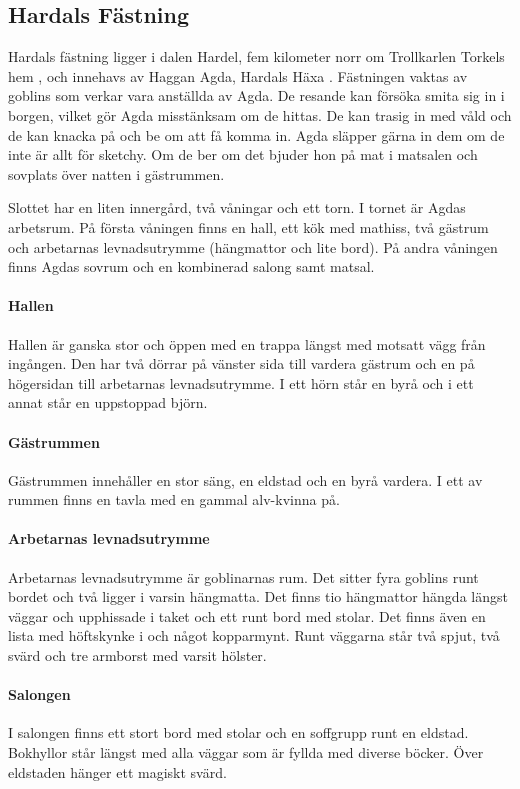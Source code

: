 \subsection{Hardals Fästning}
Hardals fästning ligger i dalen Hardel, fem kilometer norr om Trollkarlen Torkels hem \sectiondescribe{\ref{torkelsStuga}}, och innehavs av Haggan Agda, Hardals Häxa \sectiondescribe{\ref{hagganAgda}}. Fästningen vaktas av goblins som verkar vara anställda av Agda. De resande kan försöka smita sig in i borgen, vilket gör Agda misstänksam om de hittas. De kan trasig in med våld och de kan knacka på och be om att få komma in. Agda släpper gärna in dem om de inte är allt för sketchy. Om de ber om det bjuder hon på mat i matsalen och sovplats över natten i gästrummen.

Slottet har en liten innergård, två våningar och ett torn. I tornet är Agdas arbetsrum. På första våningen finns en hall, ett kök med mathiss, två gästrum och arbetarnas levnadsutrymme (hängmattor och lite bord). På andra våningen finns Agdas sovrum och en kombinerad salong samt matsal. 

\paragraph{Hallen}
Hallen är ganska stor och öppen med en trappa längst med motsatt vägg från ingången. Den har två dörrar på vänster sida till vardera gästrum och en på högersidan till arbetarnas levnadsutrymme. I ett hörn står en byrå och i ett annat står en uppstoppad björn. 

\paragraph{Gästrummen}
Gästrummen innehåller en stor säng, en eldstad och en byrå vardera. I ett av rummen finns en tavla med en gammal alv-kvinna på. 

\paragraph{Arbetarnas levnadsutrymme}
Arbetarnas levnadsutrymme är goblinarnas rum. Det sitter fyra goblins runt bordet och två ligger i varsin hängmatta. Det finns tio hängmattor hängda längst väggar och upphissade i taket och ett runt bord med stolar. Det finns även en lista med höftskynke i och något kopparmynt. Runt väggarna står två spjut, två svärd och tre armborst med varsit hölster.

\paragraph{Salongen}
I salongen finns ett stort bord med stolar och en soffgrupp runt en eldstad. Bokhyllor står längst med alla väggar som är fyllda med diverse böcker. Över eldstaden hänger ett magiskt svärd. 


